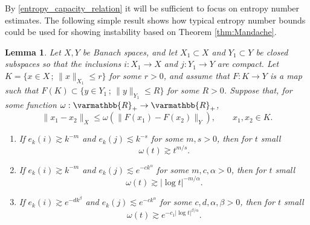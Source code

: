 \documentclass[12pt,twoside]{amsart}
\numberwithin{equation}{section}
\renewcommand{\leq}{\leqslant}
\renewcommand{\mathbb}{\varmathbb}
\newtheorem{lemma}[theorem]{Lemma}
\newcommand{\mR}{\mathbb{R}}                    %
\newcommand{\abs}[1]{\lvert #1 \rvert}          %
\newcommand{\norm}[1]{\lVert #1 \rVert}         %
\begin{document}
By \eqref{entropy_capacity_relation} it will be sufficient to focus on entropy number estimates. The following simple result shows how typical entropy number bounds could be used for showing instability based on Theorem \ref{thm:Mandache}.

\begin{lemma} \label{lemma_entropy_typical}
Let $X, Y$ be Banach spaces, and let $X_1 \subset X$ and $Y_1 \subset Y$ be closed subspaces so that the inclusions $i: X_1 \to X$ and $j: Y_1 \to Y$ are compact. Let $K = \{ x \in X \,;\, \norm{x}_{X_1} \leq r \}$ for some $r > 0$, and assume that $F: K \to Y$ is a map such that $F(K) \subset \{ y \in Y_1 \,;\, \norm{y}_{Y_1} \leq R \}$ for some $R > 0$. Suppose that, for some function $\omega: \mR_+ \to \mR_+$, 
\[
\norm{x_1 - x_2}_X \leq \omega(\norm{F(x_1) - F(x_2)}_Y), \qquad x_1, x_2 \in K.
\]
\begin{enumerate}
\item[(a)] 
If $e_k(i) \gtrsim k^{-m}$ and $e_k(j) \lesssim k^{-s}$ for some $m, s > 0$, then for $t$ small 
\[
\label{eq:mod_a}
\omega(t) \gtrsim t^{m/s}.
\]
\item[(b)] 
If $e_k(i) \gtrsim k^{-m}$ and $e_k(j) \lesssim e^{-ck^{\alpha}}$ for some $m, c, \alpha > 0$, then for $t$ small 
\[
\omega(t) \gtrsim \abs{\log t}^{-m/\alpha}.
\]
\item[(c)] 
If $e_k(i) \gtrsim e^{-dk^{\beta}}$ and $e_k(j) \lesssim e^{-ck^{\alpha}}$ for some $c, d, \alpha, \beta > 0$, then for $t$ small 
\[
\omega(t) \gtrsim e^{-c_1 \abs{\log t}^{\beta/\alpha}}.
\]
\end{enumerate}
\end{lemma}
\end{document}
